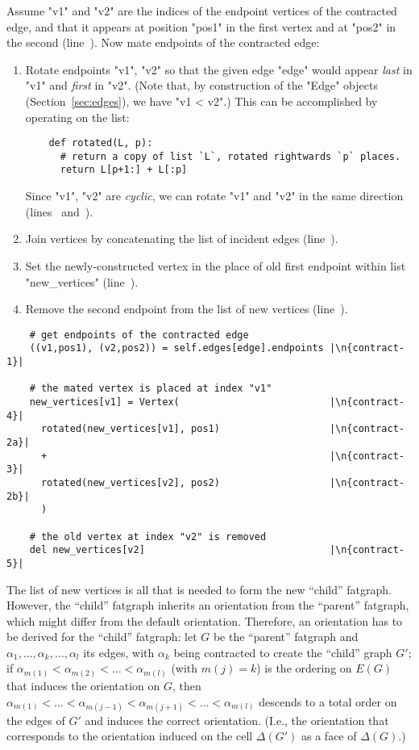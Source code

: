Assume "v1" and "v2" are the indices of the endpoint vertices of the
contracted edge, and that it appears at position "pos1" in the first
vertex and at "pos2" in the second (line~).  Now mate
endpoints of the contracted edge:
\begin{enumerate}
\item Rotate endpoints "v1", "v2" so that the given edge "edge" would
  appear \emph{last} in "v1" and \emph{first} in "v2". (Note that, by
  construction of the "Edge" objects (Section~\ref{sec:edges}), we have 
  "v1 < v2".) This can be accomplished by operating on the list:
\begin{lstlisting}
    def rotated(L, p):
      # return a copy of list `L`, rotated rightwards `p` places.
      return L[p+1:] + L[:p]
\end{lstlisting}
  Since "v1", "v2" are \emph{cyclic}, we can rotate "v1" and "v2" in
  the same direction (lines~ and~).
\item Join vertices by concatenating the list of incident
  edges (line~).
\item Set the newly-constructed vertex in the place of old first
  endpoint within list "new_vertices" (line~).
\item Remove the second endpoint from the list of new vertices
  (line~).
\end{enumerate}
\begin{lstlisting}
    # get endpoints of the contracted edge
    ((v1,pos1), (v2,pos2)) = self.edges[edge].endpoints |\n{contract-1}|

    # the mated vertex is placed at index "v1"
    new_vertices[v1] = Vertex(                          |\n{contract-4}|
      rotated(new_vertices[v1], pos1)                   |\n{contract-2a}|
      +                                                 |\n{contract-3}|
      rotated(new_vertices[v2], pos2)                   |\n{contract-2b}|
      )

    # the old vertex at index "v2" is removed
    del new_vertices[v2]                                |\n{contract-5}|

\end{lstlisting}

The list of new vertices is all that is needed to form the new
``child'' fatgraph.  However, the ``child'' fatgraph inherits an
orientation from the ``parent'' fatgraph, which might differ from the
default orientation.  Therefore, an orientation has to be derived for
the ``child'' fatgraph: let $G$ be the ``parent'' fatgraph and
$\alpha_1, \ldots, \alpha_k, \ldots, \alpha_l$ its edges, with
$\alpha_k$ being contracted to create the ``child'' graph $G'$; if
$\alpha_{m(1)} < \alpha_{m(2)} < \ldots < \alpha_{m(l)}$ (with $m(j) = k$)
is the ordering on $E(G)$ that induces the orientation on $G$, then
$\alpha_{m(1)} < \ldots < \alpha_{m(j-1)} < \alpha_{m(j+1)} < \ldots
< \alpha_{m(l)}$ descends to a total order on the edges of $G'$ and
induces the correct orientation. (I.e., the orientation that
corresponds to the orientation induced on the cell $\Delta(G')$ as a
face of $\Delta(G)$.)

